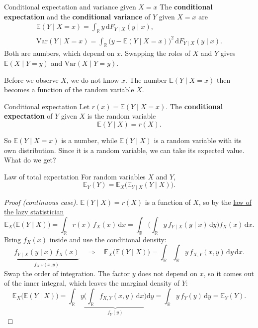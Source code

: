 \documentclass[a4paper,12pt,oneside]{report}
\begin{document}
\begin{frameddefn}{Conditional expectation and variance given $X=x$}\label{def:conditional-x}
The \textbf{conditional expectation} and the \textbf{conditional variance}
of $Y$ given $X=x$ are
\begin{gather*}
\mathbb{E}(Y\mid X=x)=\int_{\mathbb{R}}y\,\mathrm{d}F_{Y\mid X}(y\mid x),\\
\mathrm{Var}(Y\mid X=x)=\int_{\mathbb{R}}\big(y-\mathbb{E}(Y\mid X=x)\big)^2\,\mathrm{d}F_{Y\mid X}(y\mid x).
\end{gather*}
Both are numbers, which depend on $x$. Swapping the roles of $X$ and $Y$
gives $\mathbb{E}(X\mid Y=y)$ and $\mathrm{Var}(X\mid Y=y)$.
\end{frameddefn}

Before we observe $X$, we do not know $x$. The number
$\mathbb{E}(Y\mid X=x)$ then becomes a function of the random variable $X$.

\begin{frameddefn}{Conditional expectation}\label{def:conditional}
Let $r(x)=\mathbb{E}(Y\mid X=x)$. The \textbf{conditional expectation} of
$Y$ given $X$ is the random variable
\[
\mathbb{E}(Y\mid X)=r(X).
\]
\end{frameddefn}

So $\mathbb{E}(Y\mid X=x)$ is a number, while $\mathbb{E}(Y\mid X)$ is a
random variable with its own distribution. Since it is a random variable,
we can take its expected value. What do we get?

\begin{framedthm}{Law of total expectation}\label{thm:total-expectation}
For random variables $X$ and $Y$,
\[
\mathbb{E}_Y(Y)=\mathbb{E}_X\big(\mathbb{E}_{Y\mid X}(Y\mid X)\big).
\]
\end{framedthm}

\begin{proof}[Proof (continuous case)]
$\mathbb{E}(Y\mid X)=r(X)$ is a function of $X$, so by the
\hyperref[sec:lazy]{law of the lazy statistician}
\[
\mathbb{E}_X\big(\mathbb{E}(Y\mid X)\big)=\int_{\mathbb{R}}r(x)\,f_X(x)\,\mathrm{d}x
=\int_{\mathbb{R}}\Big(\int_{\mathbb{R}}y\,f_{Y\mid X}(y\mid x)\,\mathrm{d}y\Big)f_X(x)\,\mathrm{d}x .
\]
Bring $f_X(x)$ inside and use the conditional density:
\[
\underbrace{f_{Y\mid X}(y\mid x)\,f_X(x)}_{f_{X,Y}(x,y)}
\quad\Longrightarrow\quad
\mathbb{E}_X\big(\mathbb{E}(Y\mid X)\big)=\int_{\mathbb{R}}\int_{\mathbb{R}}y\,f_{X,Y}(x,y)\,\mathrm{d}y\,\mathrm{d}x .
\]
Swap the order of integration. The factor $y$ does not depend on $x$, so it
comes out of the inner integral, which leaves the marginal density of $Y$:
\[
\mathbb{E}_X\big(\mathbb{E}(Y\mid X)\big)
=\int_{\mathbb{R}}y\underbrace{\Big(\int_{\mathbb{R}}f_{X,Y}(x,y)\,\mathrm{d}x\Big)}_{f_Y(y)}\mathrm{d}y
=\int_{\mathbb{R}}y\,f_Y(y)\,\mathrm{d}y=\mathbb{E}_Y(Y).
\]
\end{proof}
\end{document}
